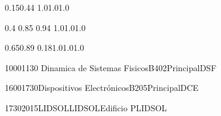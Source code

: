 \documentclass[a4paper,10pt]{report}
\begin{document}
 \thispagestyle{empty}
 \begin{landscape}
 
 \setslotsize{2.8cm}{0.25cm}
 \settextframe{1.0mm}
 
 
 
  {0.15}{0.44} {1.0}{1.0}{1.0}
 
      {0.4} {0.85} {0.94} {1.0}{1.0}{1.0}
 
        {0.65}{0.89} {0.18}{1.0}{1.0}{1.0}

 
 
 
 
 
 
 \begin{timetable}
 

 
   
   
    {1000}{1130}{ Dinamica de Sistemas Fisicos}{B402}{{\tiny Principal}}{DSF}
   
    {1600}{1730}{Dispositivos  Electrónicos}{B205}{{\tiny  Principal}}{DCE}
   
   {1730}{2015}{LIDSOL}{LIDSOL}{{\tiny Edificio P}}{LIDSOL}
   
    

\end{timetable}
\end{landscape}
\end{document}
